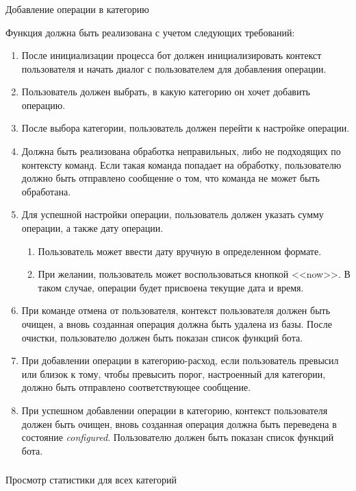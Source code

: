 \subsubsection{} Добавление операции в категорию
\label{sec:domain:specification:addoperationtocategory}

Функция должна быть реализована с учетом следующих требований:

\begin{enumerate}
	\item После инициализации процесса бот должен инициализировать контекст пользователя и начать диалог с пользователем для добавления операции.
	\item Пользователь должен выбрать, в какую категорию он хочет добавить операцию.
	\item После выбора категории, пользователь должен перейти к настройке операции.
	\item Должна быть реализована обработка неправильных, либо не подходящих по контексту команд. Если такая команда попадает на обработку, пользователю должно быть отправлено сообщение о том, что команда не может быть обработана.
	\item Для успешной настройки операции, пользователь должен указать сумму операции, а также дату операции.
	\begin{enumerate}
		\item Пользователь может ввести дату вручную в определенном формате.
		\item При желании, пользователь может воспользоваться кнопкой <<now>>. В таком случае, операции будет присвоена текущие дата и время.
	\end{enumerate}
	\item При команде отмена от пользователя, контекст пользователя должен быть очищен, а вновь созданная операция должна быть удалена из базы. После очистки, пользователю должен быть показан список функций бота.
	\item При добавлении операции в категорию-расход, если пользователь превысил или близок к тому, чтобы превысить порог, настроенный для категории, должно быть отправлено соответствующее сообщение.
	\item При успешном добавлении операции в категорию, контекст пользователя должен быть очищен, вновь созданная операция должна быть переведена в состояние \emph{configured}. Пользователю должен быть показан список функций бота.
\end{enumerate}

\subsubsection{} Просмотр статистики для всех категорий
\label{sec:domain:specification:showallstats}

